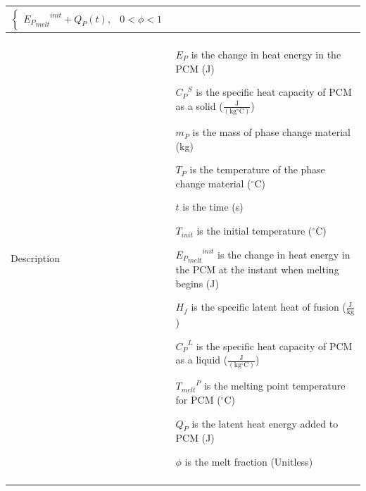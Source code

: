 \documentclass[12pt]{article}
\begin{document}
\begin{minipage}{\textwidth}
\begin{tabular}{>{\raggedright}p{}>{\raggedright\arraybackslash}p{}}
\begin{displaymath}
\begin{cases}
{{{E_{P}}_{melt}}^{init}}+{Q_{P}}\left(t\right), & 0<ϕ<1
\end{cases}
           \end{displaymath}
\\ \midrule \\
Description & \begin{symbDescription}
              \item{${E_{P}}$ is the change in heat energy in the PCM (J)}
              \item{${{C_{P}}^{S}}$ is the specific heat capacity of PCM as a solid ($\frac{\text{J}}{(\text{kg}{}^{\circ}\text{C})}$)}
              \item{${m_{P}}$ is the mass of phase change material (kg)}
              \item{${T_{P}}$ is the temperature of the phase change material (${}^{\circ}$C)}
              \item{$t$ is the time (s)}
              \item{${T_{init}}$ is the initial temperature (${}^{\circ}$C)}
              \item{${{{E_{P}}_{melt}}^{init}}$ is the change in heat energy in the PCM at the instant when melting begins (J)}
              \item{${H_{f}}$ is the specific latent heat of fusion ($\frac{\text{J}}{\text{kg}}$)}
              \item{${{C_{P}}^{L}}$ is the specific heat capacity of PCM as a liquid ($\frac{\text{J}}{(\text{kg}{}^{\circ}\text{C})}$)}
              \item{${{T_{melt}}^{P}}$ is the melting point temperature for PCM (${}^{\circ}$C)}
              \item{${Q_{P}}$ is the latent heat energy added to PCM (J)}
              \item{$ϕ$ is the melt fraction (Unitless)}
              \end{symbDescription}
\\ \midrule \\

\end{tabular}
\end{minipage}
\end{document}
